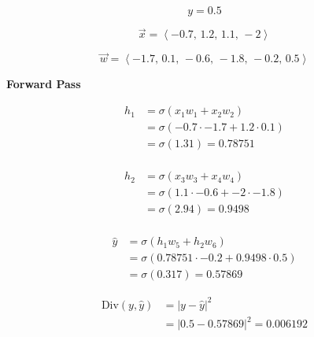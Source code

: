 \documentclass[12pt]{article}
\begin{document}
\begin{equation}
    y = 0.5
\end{equation}

\begin{equation}
    \vec{x} = \left<-0.7,\, 1.2,\, 1.1,\, -2\right>
\end{equation}

\begin{equation}
    \vec{w} = \left< -1.7 ,\, 0.1 ,\, -0.6 ,\, -1.8 ,\, -0.2 ,\, 0.5 \right>
\end{equation}

\noindent
\textbf{Forward Pass}

\begin{equation}
    \begin{split}
        h_1 &= \sigma(x_1 w_1 + x_2 w_2) \\
        &= \sigma(-0.7 \cdot -1.7 + 1.2 \cdot 0.1) \\
        &= \sigma(1.31) = 0.78751 \\
    \end{split}
\end{equation}

\begin{equation}
    \begin{split}
        h_2 &= \sigma(x_3 w_3 + x_4 w_4) \\
        &= \sigma(1.1 \cdot -0.6 + -2 \cdot -1.8) \\
        &= \sigma(2.94) = 0.9498 \\
    \end{split}
\end{equation}

\begin{equation}
    \begin{split}
        \hat{y}&= \sigma(h_1 w_5 + h_2 w_6) \\
        &= \sigma(0.78751 \cdot -0.2 + 0.9498 \cdot 0.5) \\
        &= \sigma(0.317) = 0.57869
    \end{split}
\end{equation}

\begin{equation}
    \begin{split}
        \text{Div}(y,\hat{y}) &= |y - \hat{y}|^2 \\
        &= |0.5-0.57869|^2 = 0.006192 \\
    \end{split}
\end{equation}
\end{document}
